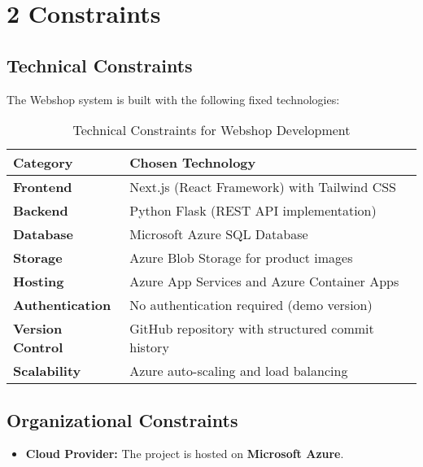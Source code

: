 \hypertarget{constraints}{%
\section{2 Constraints}\label{section-constraints}}

\subsection{Technical Constraints}
The Webshop system is built with the following fixed technologies:

\begin{table}[h]
\centering
\begin{tabular}{|l|l|}
\hline
\textbf{Category} & \textbf{Chosen Technology} \\ \hline
\textbf{Frontend} & Next.js (React Framework) with Tailwind CSS \\ \hline
\textbf{Backend} & Python Flask (REST API implementation) \\ \hline
\textbf{Database} & Microsoft Azure SQL Database \\ \hline
\textbf{Storage} & Azure Blob Storage for product images \\ \hline
\textbf{Hosting} & Azure App Services and Azure Container Apps \\ \hline
\textbf{Authentication} & No authentication required (demo version) \\ \hline
\textbf{Version Control} & GitHub repository with structured commit history \\ \hline
\textbf{Scalability} & Azure auto-scaling and load balancing \\ \hline
\end{tabular}
\caption{Technical Constraints for Webshop Development}
\label{tab:constraints}
\end{table}

\subsection{Organizational Constraints}
\begin{itemize}
    \item \textbf{Cloud Provider:} The project is hosted on \textbf{Microsoft Azure}.
\end{itemize}

